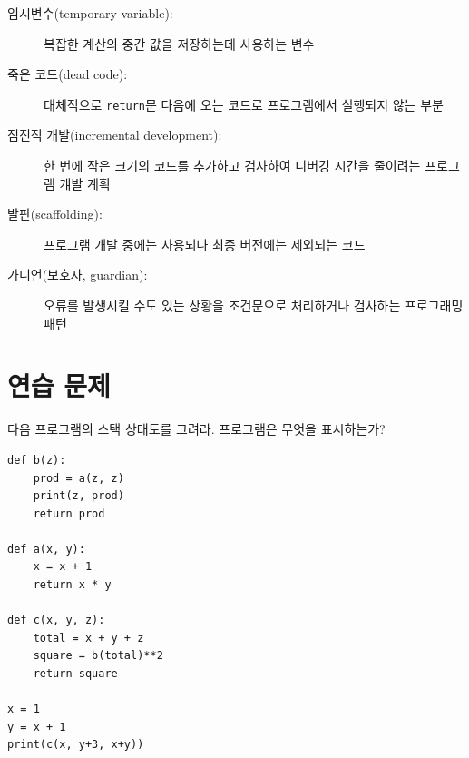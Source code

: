 \documentclass[10pt]{book}
\begin{document}
\begin{description}

\item[임시변수(temporary variable):] 복잡한 계산의 중간 값을 저장하는데
  사용하는 변수

\item[죽은 코드(dead code):] 대체적으로 {\tt return}문 다음에 오는
  코드로 프로그램에서 실행되지 않는 부분

\item[점진적 개발(incremental development):] 한 번에 작은 크기의 코드를
  추가하고 검사하여 디버깅 시간을 줄이려는 프로그램 걔발 계획

\item[발판(scaffolding):] 프로그램 개발 중에는 사용되나 최종 버전에는
  제외되는 코드

\item[가디언(보호자, guardian):] 오류를 발생시킬 수도 있는 상황을
  조건문으로 처리하거나 검사하는 프로그래밍 패턴


\end{description}


\section{연습 문제}

\begin{exercise}

다음 프로그램의 스택 상태도를 그려라.  프로그램은 무엇을 표시하는가?

\begin{verbatim}
def b(z):
    prod = a(z, z)
    print(z, prod)
    return prod

def a(x, y):
    x = x + 1
    return x * y

def c(x, y, z):
    total = x + y + z
    square = b(total)**2
    return square

x = 1
y = x + 1
print(c(x, y+3, x+y))
\end{verbatim}

\end{exercise}
\end{document}

